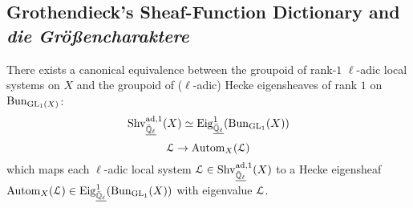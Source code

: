     \subsection{Grothendieck's Sheaf-Function Dictionary and \textit{die Gr\"o{\ss}encharaktere}}
        \begin{theorem} \label{theorem: unramified_abelian_geometric_class_field_theory}
            There exists a canonical equivalence between the groupoid of rank-$1$ $\ell$-adic local systems on $X$ and the groupoid of ($\ell$-adic) Hecke eigensheaves of rank $1$ on $\mathrm{Bun}_{\operatorname{GL}_1(X)}$:
                $$\mathrm{Shv}_{\underline{\bar{\mathbb{Q}}_{\ell}}}^{\mathrm{ad}, 1}(X) \simeq \mathrm{Eig}_{\underline{\bar{\mathbb{Q}}_{\ell}}}^1(\mathrm{Bun}_{\operatorname{GL}_1}(X))$$
                $$\mathcal{L} \to \mathrm{Autom}_X(\mathcal{L})$$
            which maps each $\ell$-adic local system $\mathcal{L} \in \mathrm{Shv}_{\underline{\bar{\mathbb{Q}}_{\ell}}}^{\mathrm{ad}, 1}(X)$ to a Hecke eigensheaf $\mathrm{Autom}_X(\mathcal{L}) \in \mathrm{Eig}_{\underline{\bar{\mathbb{Q}}_{\ell}}}^1(\mathrm{Bun}_{\operatorname{GL}_1}(X))$ with eigenvalue $\mathcal{L}$.
        \end{theorem}
